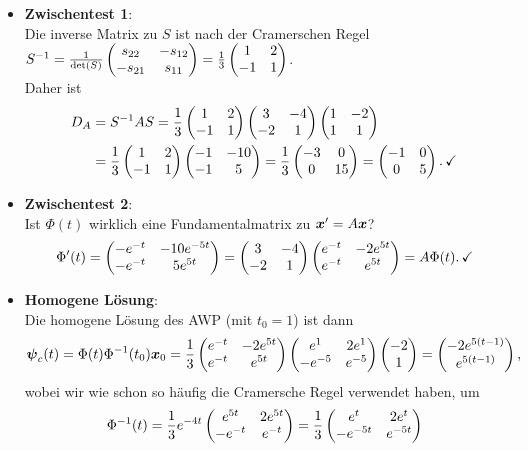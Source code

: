 \begin{Beispiel}
\begin{itemize}
    \item \textbf{Zwischentest 1}:\\
    Die inverse Matrix zu $S$ ist nach der Cramerschen Regel\\ $S^{-1}=\frac{1}{\det(S)}\begin{pmatrix}s_{22}&-s_{12}\\-s_{21}&s_{11}\end{pmatrix}=\frac{1}{3}\begin{pmatrix}1&2\\-1&1\end{pmatrix}$.\\
    Daher ist
    \begin{align*}
        D_A&=S^{-1}AS=\frac{1}{3}\begin{pmatrix}1&2\\-1&1\end{pmatrix}\begin{pmatrix}3&-4\\-2&1\end{pmatrix}\begin{pmatrix}1&-2\\1&1\end{pmatrix}\\
        &=\frac{1}{3}\begin{pmatrix}1&2\\-1&1\end{pmatrix}\begin{pmatrix}-1&-10\\-1&5\end{pmatrix}=\frac{1}{3}\begin{pmatrix}-3&0\\0&15\end{pmatrix}=\begin{pmatrix}-1&0\\0&5\end{pmatrix}.\,\checkmark
    \end{align*}
    \item \textbf{Zwischentest 2}:\\
    Ist $\Phi(t)$ wirklich eine Fundamentalmatrix zu ${{\text{\boldmath${x}$}}}'=A{{\text{\boldmath${x}$}}}$?
    \begin{equation*}
        \Phi'(t)=\begin{pmatrix}-e^{-t}&-10e^{-5t}\\-e^{-t}&5e^{5t}\end{pmatrix}=\begin{pmatrix}3&-4\\-2&1\end{pmatrix}\begin{pmatrix}e^{-t}&-2e^{5t}\\e^{-t}&e^{5t}\end{pmatrix}=A\Phi(t).\,\checkmark
    \end{equation*}
    \item \textbf{Homogene Lösung}:\\
    Die homogene Lösung des AWP (mit $t_0=1$) ist dann
    \begin{equation*}
        {{\text{\boldmath${\psi}$}}}_c(t)=\Phi(t)\Phi^{-1}(t_0){{\text{\boldmath${x}$}}}_0=\frac{1}{3}\begin{pmatrix}e^{-t}&-2e^{5t}\\e^{-t}&e^{5t}\end{pmatrix}\begin{pmatrix}e^1&2e^1\\-e^{-5}&e^{-5}\end{pmatrix}\begin{pmatrix}-2\\1\end{pmatrix}=\begin{pmatrix}-2e^{5(t-1)}\\e^{5(t-1)}\end{pmatrix},
    \end{equation*}
    wobei wir wie schon so häufig die Cramersche Regel verwendet haben, um
    \begin{equation*}
        \Phi^{-1}(t)=\frac{1}{3}e^{-4t}\Matrix{e^{5t}&2e^{5t}\\-e^{-t}&e^{-t}}=\frac{1}{3}\Matrix{e^t&2e^t\\-e^{-5t}&e^{-5t}}

\end{equation*}
\end{itemize}
\end{Beispiel}
